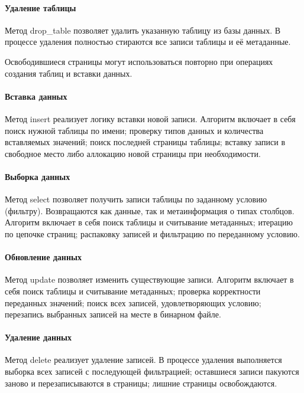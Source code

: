 \paragraph{Удаление таблицы}

Метод drop\_table позволяет удалить указанную таблицу из базы данных. В процессе удаления полностью стираются все записи таблицы и её метаданные.

Освободившиеся страницы могут использоваться повторно при операциях создания таблиц и вставки данных.

\paragraph{Вставка данных}

Метод insert реализует логику вставки новой записи. Алгоритм включает в себя поиск нужной таблицы по имени; проверку типов данных и количества вставляемых значений; поиск последней страницы таблицы; вставку записи в свободное место либо аллокацию новой страницы при необходимости.

\paragraph{Выборка данных}

Метод select позволяет получить записи таблицы по заданному условию (фильтру). Возвращаются как данные, так и метаинформация о типах столбцов. Алгоритм включает в себя поиск таблицы и считывание метаданных; итерацию по цепочке страниц; распаковку записей и фильтрацию по переданному условию.

\paragraph{Обновление данных}

Метод update позволяет изменить существующие записи. Алгоритм включает в себя поиск таблицы и считывание метаданных; проверка корректности переданных значений; поиск всех записей, удовлетворяющих условию; перезапись выбранных записей на месте в бинарном файле.

\paragraph{Удаление данных}

Метод delete реализует удаление записей. В процессе удаления выполняется выборка всех записей с последующей фильтрацией; оставшиеся записи пакуются заново и перезаписываются в страницы; лишние страницы освобождаются.

